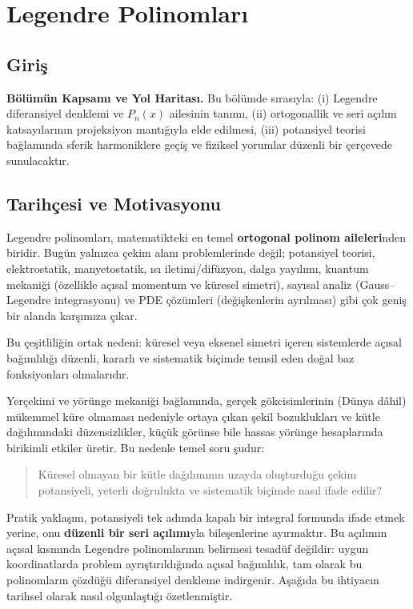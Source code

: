 \chapter{Legendre Polinomları}

\section{Giriş}

\medskip
\noindent
\textbf{Bölümün Kapsamı ve Yol Haritası.}
Bu bölümde sırasıyla:
(i) Legendre diferansiyel denklemi ve $P_n(x)$ ailesinin tanımı,
(ii) ortogonallik ve seri açılım katsayılarının projeksiyon mantığıyla elde edilmesi,
(iii) potansiyel teorisi bağlamında sferik harmoniklere geçiş ve fiziksel yorumlar
düzenli bir çerçevede sunulacaktır.


\newpage
\section{Tarihçesi ve Motivasyonu}

Legendre polinomları, matematikteki en temel \textbf{ortogonal polinom aileleri}nden biridir. Bugün yalnızca çekim alanı problemlerinde değil; potansiyel teorisi, elektrostatik,
manyetostatik, ısı iletimi/difüzyon, dalga yayılımı, kuantum mekaniği (özellikle açısal momentum ve küresel simetri),
sayısal analiz (Gauss--Legendre integrasyonu) ve PDE çözümleri (değişkenlerin ayrılması) gibi çok geniş bir alanda karşımıza çıkar.

\medskip
Bu çeşitliliğin ortak nedeni: küresel veya eksenel simetri içeren sistemlerde açısal bağımlılığı düzenli, kararlı ve sistematik biçimde temsil eden doğal baz fonksiyonları olmalarıdır.

\medskip
Yerçekimi ve yörünge mekaniği bağlamında, gerçek gökcisimlerinin (Dünya dâhil) mükemmel küre olmaması nedeniyle ortaya çıkan şekil bozuklukları ve kütle dağılımındaki düzensizlikler, küçük görünse bile hassas yörünge hesaplarında birikimli etkiler üretir. Bu nedenle temel soru şudur:

\begin{quote}
Küresel olmayan bir kütle dağılımının uzayda oluşturduğu çekim potansiyeli,
yeterli doğrulukta ve sistematik biçimde nasıl ifade edilir?
\end{quote}

Pratik yaklaşım, potansiyeli tek adımda kapalı bir integral formunda ifade etmek yerine, onu \textbf{düzenli bir seri açılımı}yla bileşenlerine ayırmaktır. Bu açılımın açısal kısmında Legendre polinomlarının belirmesi tesadüf değildir: uygun koordinatlarda problem ayrıştırıldığında açısal bağımlılık, tam olarak bu polinomların çözdüğü diferansiyel denkleme indirgenir.
Aşağıda bu ihtiyacın tarihsel olarak nasıl olgunlaştığı özetlenmiştir.

